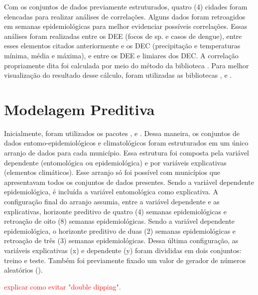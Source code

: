 \indent Com os conjuntos de dados previamente estruturados, quatro (4) cidades foram elencadas para realizar análises de correlações. Alguns dados foram retroagidos em semanas epidemiológicas para melhor evidenciar possíveis correlações. Essas análises foram realizadas entre os \acrshort{DEE} (focos de  sp. e casos de dengue), entre esses elementos citados anteriormente e os \acrshort{DEC} (precipitação e temperaturas mínima, média e máxima), e entre os \acrshort{DEE} e limiares dos \acrshort{DEC}. A correlação propriamente dita foi calculada por meio do método  da biblioteca . Para melhor visualização do resultado desse cálculo, foram utilizadas as bibliotecas ,  \cite{matplotlib_2007_hunter} e  \cite{seaborn_2021_waskom}.

\section{Modelagem Preditiva}

\indent Inicialmente, foram utilizados os pacotes ,  e  \cite{scikit-learn_2011_pedregosa, sklearn_2013_buitinck}. Dessa maneira, os conjuntos de dados entomo-epidemiológicos e climatológicos foram estruturados em um único arranjo de dados para cada município. Essa estrutura foi composta pela variável dependente (entomológica ou epidemiológica) e por variáveis explicativas (elementos climáticos). Esse arranjo só foi possível com municípios que apresentavam todos os conjuntos de dados presentes. Sendo a variável dependente epidemiológica, é incluída a variável entomológica como explicativa. A configuração final do arranjo assumia, entre a variável dependente e as explicativas, horizonte preditivo de quatro (4) semanas epidemiológicas e retroação de oito (8) semanas epidemiológicas. Sendo a variável dependente epidemiológica, o horizonte preditivo de duas (2) semanas epidemiológicas e retroação de três (3) semanas epidemiológicas. Dessa última configuração, as variáveis explicativas (x) e dependente (y) foram divididas em dois conjuntos: treino e teste. Também foi previamente fixado um valor de gerador de números aleatórios ().

\indent \textcolor{red}{explicar como evitar "double dipping".}

